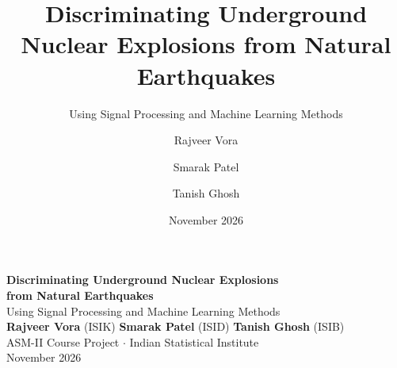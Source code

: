 \documentclass[aspectratio=169,11pt]{beamer}
\title{Discriminating Underground Nuclear Explosions from Natural Earthquakes}
\subtitle{Using Signal Processing and Machine Learning Methods}
\author{Rajveer Vora \and Smarak Patel \and Tanish Ghosh}
\institute{ASM-II Course Project $\cdot$ Indian Statistical Institute}
\date{November 2026}
\begin{document}
{
\begin{frame}[plain]
  \vspace*{0.75cm}
  \centering
  {\fontsize{22}{26}\selectfont \textbf{\color{white} Discriminating Underground Nuclear Explosions\\[0.25em] from Natural Earthquakes}}\\[0.8em]
  {\fontsize{12}{15}\selectfont \color{tealaccent} Using Signal Processing and Machine Learning Methods}\\[1.8em]

  {\fontsize{11}{14}\selectfont \color{white}
    \textbf{Rajveer Vora} (ISIK) \qquad
    \textbf{Smarak Patel} (ISID) \qquad
    \textbf{Tanish Ghosh} (ISIB)
  }\\[0.9em]

  {\fontsize{10}{12}\selectfont \color{slate}
    ASM-II Course Project $\cdot$ Indian Statistical Institute\\[0.3em]
    November 2026
  }
\end{frame}
}
\end{document}
